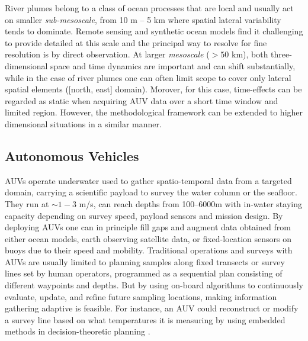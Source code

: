 \documentclass[aoas]{imsart}
\begin{document}


River plumes belong to a class of ocean processes that are local and
usually act on smaller \emph{sub-mesoscale}, from 10 m -- 5 km where
spatial lateral variability tends to dominate. Remote sensing and
synthetic ocean models find it challenging to provide detailed at this
scale \citep{Lermusiaux:2006} and the principal way to resolve for fine
resolution is by direct observation. At larger \emph{mesoscale} ($>50$
km), both three-dimensional space and time dynamics are important and
can shift substantially, while in the case of river plumes one can often
limit scope to cover only lateral spatial elements ([north, east]
domain). Morover, for this case, time-effects can be regarded as static when
acquiring AUV data over a short time window and limited region. However,
the methodological framework can be extended to higher dimensional situations in a similar manner.

\subsection{Autonomous Vehicles}

AUVs operate underwater used to gather spatio-temporal data from a
targeted domain, carrying a scientific payload to survey the water
column or the seafloor. They run at $\sim 1-3$ m/s, can reach depths
from 100--6000m with in-water staying capacity depending on survey
speed, payload sensors and mission design. By deploying AUVs one can in
principle fill gaps and augment data obtained from either ocean models,
earth observing satellite data, or fixed-location sensors on buoys due
to their speed and mobility. Traditional operations and surveys with
AUVs are usually limited to planning samples along fixed transects or
survey lines set by human operators, programmed as a sequential plan
consisting of different waypoints and depths. But by using on-board
algorithms to continuously evaluate, update, and refine future sampling
locations, making information gathering adaptive \citep{das11b} is
feasible. For instance, an AUV could reconstruct or modify a survey line
based on what temperatures it is measuring by using embedded methods in
decision-theoretic planning \citep{Rajan12b}.
\end{document}
